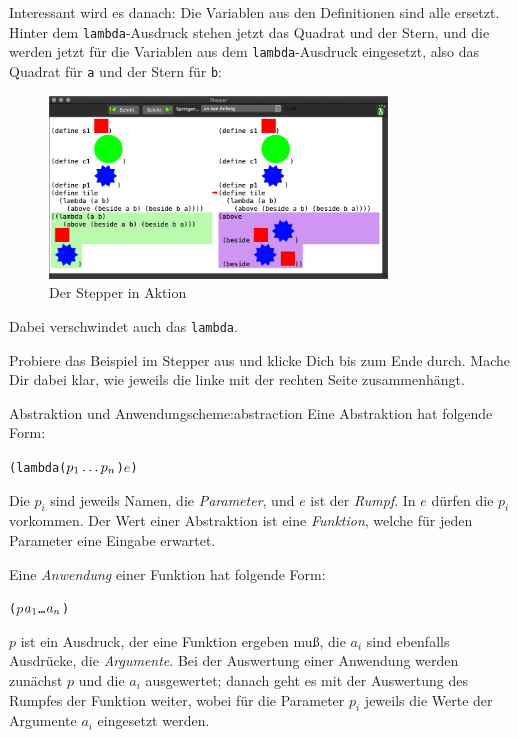 %
\noindent Interessant wird es danach: Die Variablen aus den Definitionen sind
alle ersetzt.  Hinter dem \texttt{lambda}-Ausdruck stehen jetzt das
Quadrat und der Stern, und die werden jetzt für die Variablen aus dem
\texttt{lambda}-Ausdruck eingesetzt, also das Quadrat für \texttt{a}
und der Stern für \texttt{b}:
%
\begin{figure}[H]
  \centering
  \includegraphics[width=0.8\textwidth]{i1prog/stepper-3}
  \caption{Der Stepper in Aktion}
  \label{fig:stepper-3}
\end{figure}
%
\noindent Dabei verschwindet auch das \texttt{lambda}.
%
\begin{aufgabe}
  Probiere das Beispiel im Stepper aus und klicke Dich bis zum Ende
  durch. Mache Dir dabei klar, wie jeweils die linke mit der rechten
  Seite zusammenhängt.
\end{aufgabe}
%

\begin{feature}{Abstraktion und Anwendung}{scheme:abstraction}
  Eine Abstraktion hat folgende Form:
\begin{alltt}
(lambda (\(p\sb{1} \ldots p\sb{n}\)) \(e\))
\end{alltt}
  Die $p_i$ sind jeweils Namen, die \textit{Parameter}, und
  $e$ ist der \textit{Rumpf}.  In $e$ dürfen die $p_i$
  vorkommen.  Der Wert einer Abstraktion ist eine \textit{Funktion},
  welche für jeden Parameter eine Eingabe erwartet.

  Eine \textit{Anwendung} einer Funktion hat folgende Form:
\begin{alltt}
(\(p\) \(a\sb{1}\) \ldots \(a\sb{n}\))
\end{alltt}
  $p$ ist ein Ausdruck, der eine Funktion ergeben muß, die $a_i$ sind
  ebenfalls Ausdrücke, die \textit{Argumente}.  Bei
  der Auswertung einer Anwendung werden zunächst $p$ und die $a_i$
  ausgewertet; danach geht es mit der Auswertung des Rumpfes der
  Funktion weiter, wobei für die Parameter $p_i$ jeweils die Werte der
  Argumente $a_i$ eingesetzt werden.
\end{feature}


